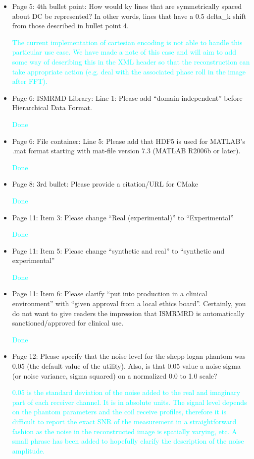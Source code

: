 \documentclass[12pt, draft]{article}
\makeatletter
\def\namedlabel#1#2{\begingroup#2\def\@currentlabel{#2}\phantomsection\label{#1}\endgroup}
\newcommand{\question}[1]{\item[\namedlabel{q#1}{#1}]}
\newcommand{\response}[1]{\textcolor{cyan}{#1}}
\makeatother
\begin{document}
{\begin{itemize}
\response{Done}

\question{R2.17} Page 5: 4th bullet point: How would ky lines that are symmetrically spaced about DC be represented? In other words, lines that have a 0.5 delta\_k shift from those described in bullet point 4.

\response{The current implementation of cartesian encoding is not able to handle this particular use case.  We have made a note of this case and will aim to add some way of describing this in the XML header so that the reconstruction can take appropriate action (e.g. deal with the associated phase roll in the image after FFT).}

\question{R2.18} Page 6: ISMRMD Library: Line 1: Please add ``domain-independent'' before Hierarchical Data Format.

\response{Done}

\question{R2.19} Page 6: File container: Line 5: Please add that HDF5 is used for MATLAB's .mat format starting with mat-file version 7.3 (MATLAB R2006b or later).

\response{Done}

\question{R2.20} Page 8: 3rd bullet: Please provide a citation/URL for CMake

\response{Done}

\question{R2.21} Page 11: Item 3: Please change ``Real (experimental)'' to ``Experimental''

\response{Done}

\question{R2.22} Page 11: Item 5: Please change ``synthetic and real'' to ``synthetic and experimental''

\response{Done}

\question{R2.23} Page 11: Item 6: Please clarify ``put into production in a clinical environment'' with ``given approval from a local ethics board''. Certainly, you do not want to give readers the impression that ISMRMRD is automatically sanctioned/approved for clinical use.

\response{Done}

\question{R2.24} Page 12: Please specify that the noise level for the shepp logan phantom was 0.05 (the default value of the utility). Also, is that 0.05 value a noise sigma (or noise variance, sigma squared) on a normalized 0.0 to 1.0 scale?

\response{0.05 is the standard deviation of the noise added to the real and imaginary part of each receiver channel.  It is in absolute units.  The signal level depends on the phantom parameters and the coil receive profiles, therefore it is difficult to report the exact SNR of the measurement in a straightforward fashion as the noise in the reconstructed image is spatially varying, etc.  A small phrase has been added to hopefully clarify the description of the noise amplitude.}


\end{itemize}}
\end{document}
